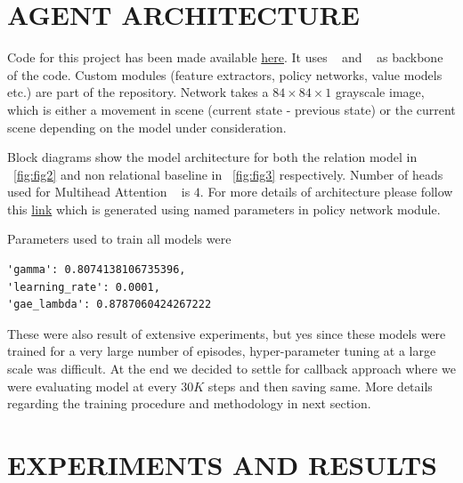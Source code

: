 \documentclass[english]{sobraep}
\begin{document}
\section{AGENT ARCHITECTURE}
Code for this project has been made available \href{https://github.com/thunderock/BiasNet/}{here}. It uses ~\cite{NEURIPS2019_9015} and ~\cite{stable-baselines3} as backbone of the code. Custom modules (feature extractors, policy networks, value models etc.) are part of the repository. Network takes a $84\times84\times1$ grayscale image, which is either a movement in scene (current state - previous state) or the current scene depending on the model under consideration.

Block diagrams show the model architecture for both the relation model in ~\ref{fig:fig2} and non relational baseline in ~\ref{fig:fig3} respectively. Number of heads used for Multihead Attention ~\cite{DBLP:journals/corr/VaswaniSPUJGKP17} is $4$. For more details of architecture please follow this \href{https://github.com/thunderock/BiasNet/blob/master/model_architecture.ipynb}{link} which is generated using named parameters in policy network module.

Parameters used to train all models were 
\begin{lstlisting}
'gamma': 0.8074138106735396, 
'learning_rate': 0.0001, 
'gae_lambda': 0.8787060424267222
\end{lstlisting}
These were also result of extensive experiments, but yes since these models were trained for a very large number of episodes, hyper-parameter tuning at a large scale was difficult. At the end we decided to settle for callback approach where we were evaluating model at every $30K$ steps and then saving same. More details regarding the training procedure and methodology in next section.


\section{EXPERIMENTS AND RESULTS}
\end{document}
